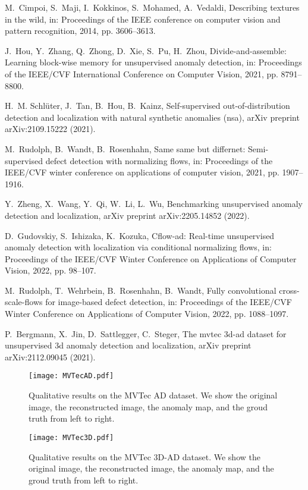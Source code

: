 \documentclass[5p, twocolumn]{elsarticle}[draft]
\begin{document}
\begin{thebibliography}{10}
M.~Cimpoi, S.~Maji, I.~Kokkinos, S.~Mohamed, A.~Vedaldi, Describing textures in
  the wild, in: Proceedings of the IEEE conference on computer vision and
  pattern recognition, 2014, pp. 3606--3613.

J.~Hou, Y.~Zhang, Q.~Zhong, D.~Xie, S.~Pu, H.~Zhou, Divide-and-assemble:
  Learning block-wise memory for unsupervised anomaly detection, in:
  Proceedings of the IEEE/CVF International Conference on Computer Vision,
  2021, pp. 8791--8800.

H.~M. Schl{\"u}ter, J.~Tan, B.~Hou, B.~Kainz, Self-supervised
  out-of-distribution detection and localization with natural synthetic
  anomalies (nsa), arXiv preprint arXiv:2109.15222 (2021).

M.~Rudolph, B.~Wandt, B.~Rosenhahn, Same same but differnet: Semi-supervised
  defect detection with normalizing flows, in: Proceedings of the IEEE/CVF
  winter conference on applications of computer vision, 2021, pp. 1907--1916.

Y.~Zheng, X.~Wang, Y.~Qi, W.~Li, L.~Wu, Benchmarking unsupervised anomaly
  detection and localization, arXiv preprint arXiv:2205.14852 (2022).

D.~Gudovskiy, S.~Ishizaka, K.~Kozuka, Cflow-ad: Real-time unsupervised anomaly
  detection with localization via conditional normalizing flows, in:
  Proceedings of the IEEE/CVF Winter Conference on Applications of Computer
  Vision, 2022, pp. 98--107.

M.~Rudolph, T.~Wehrbein, B.~Rosenhahn, B.~Wandt, Fully convolutional
  cross-scale-flows for image-based defect detection, in: Proceedings of the
  IEEE/CVF Winter Conference on Applications of Computer Vision, 2022, pp.
  1088--1097.

P.~Bergmann, X.~Jin, D.~Sattlegger, C.~Steger, The mvtec 3d-ad dataset for
  unsupervised 3d anomaly detection and localization, arXiv preprint
  arXiv:2112.09045 (2021).

\end{thebibliography}

\begin{figure*}
    \centering
		\texttt{[image: MVTecAD.pdf]}
    	\caption{Qualitative results on the MVTec AD dataset. We show the original image, the reconstructed image, the anomaly map, and the groud truth from left to right.}
	\label{FIG:7}
\end{figure*}

\begin{figure*}
    \centering
		\texttt{[image: MVTec3D.pdf]}
	\caption{Qualitative results on the MVTec 3D-AD dataset. We show the original image, the reconstructed image, the anomaly map, and the groud truth from left to right.}
	\label{FIG:8}
\end{figure*}
\end{document}
